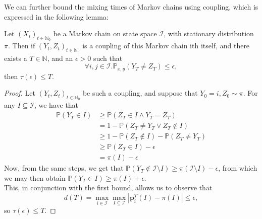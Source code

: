 		We can further bound the mixing times of Markov chains using coupling, which
		is expressed in  the following lemma:
		\begin{lemma}
			Let $(X_t)_{t\in\mathbb{N}_0}$ be a Markov chain on state space $\mathcal
			{I}$, with stationary distribution $\pi$. Then if $(Y_t,Z_t)_{t\in
			\mathbb{N}_0}$ is a coupling of this Markov
			chain ith itself, and there exists a $T\in\mathbb{N}$, and an $\epsilon>0$
			such that
			$$
				\forall i,j \in \mathcal{I}.
				\mathbb{P}_{x,y}(Y_T \neq Z_T) \leq \epsilon,
			$$
			then $\tau(\epsilon) \leq T$.
		\end{lemma}
		\begin{proof}
			Let $(Y_t, Z_t)_{t\in\mathbb{N}_0}$ be such a coupling, and suppose that
			$Y_0 = i, Z_0 \sim \pi$. For any $I \subseteq \mathcal{I}$, we have that
			\begin{align*}
				\mathbb{P}(Y_T \in I) &\geq \mathbb{P}(Z_T \in I \land Y_T=Z_T) \\
				&= 1 - \mathbb{P}(Z_T \neq Y_T \lor Z_T \notin I) \\
				&\geq 1 - \mathbb{P}(Z_T\notin I) - \mathbb{P}(Z_T \neq Y_T) \\
				&\geq \mathbb{P}(Z_T \in I) - \epsilon \\
				&= \pi(I) - \epsilon
			\end{align*}
			Now, from the same steps, we get that $\mathbb{P}(Y_T\notin\mathcal{I}
			\setminus I) \geq \pi(\mathcal{I}  \setminus I) - \epsilon$, from which we 
			may then obtain $\mathbb{P}(Y_T \in I) \geq \pi(I) + \epsilon$.\\
			This, in conjunction with the first bound, allows us to observe that
			$$
				d(T) = \max_{i\in \mathcal{I}}\max_{I\subseteq\mathcal{I}} 
				|\mathbf{p}^T_i(I)-\pi(I)| \leq \epsilon,
			$$ 
			so $\tau(\epsilon) \leq T$.
		\end{proof}

